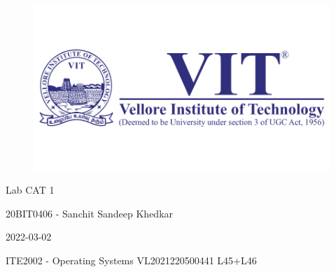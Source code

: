 \documentclass[12pt]{article}
\begin{document}
\begin{titlepage}
\NoBgThispage
   \begin{center}
        \begin{figure}[h] %
        \centering
        \includegraphics[width=15cm]{1583124354phpJTtnK5.png}
        \end{figure}

        \Huge{Lab CAT 1}

        \vspace{0.5cm}
        \LARGE{20BIT0406 - Sanchit Sandeep Khedkar}
       
        \vspace{2.5 cm}
        \Large{2022-03-02}
        
        \vspace{0.25 cm}
        \Large{ITE2002 - Operating Systems}
        \large{VL2021220500441 L45+L46}
       

       \vfill
    \end{center}
\end{titlepage}
\newpage
\end{document}
